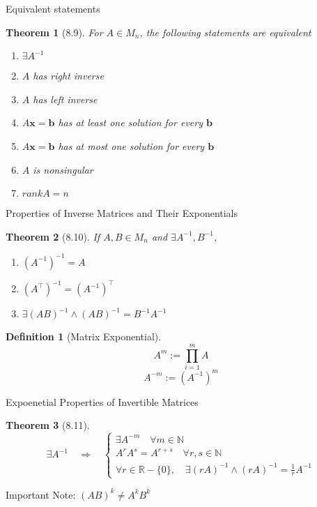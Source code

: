 \documentclass[a4paper,11pt]{article}
\newtheorem{defn}{Definition}
\newtheorem{thm}{Theorem}
\begin{document}
\begin{frame}[t]{Equivalent statements}
	\begin{thm}
		[8.9] For $A\in M_n$, the following statements are equivalent
		\begin{enumerate}
			\item $\exists A^{-1}$
			\item $A$ has right inverse
			\item $A$ has left inverse
			\item $A\mathbf{x}=\mathbf{b}$ has at least one solution for every $\mathbf{b}$
			\item $A\mathbf{x}=\mathbf{b}$ has at most one solution for every $\mathbf{b}$
			\item $A$ is nonsingular
			\item $rank A = n$
		\end{enumerate}
	\end{thm}
\end{frame}

\begin{frame}[t]{Properties of Inverse Matrices and Their Exponentials}
	\begin{thm}
		[8.10] If $A,B\in M_n$ and $\exists A^{-1}, B^{-1}$,
		\begin{enumerate}
			\item $(A^{-1})^{-1}=A$
			\item $(A^\intercal)^{-1}=(A^{-1})^\intercal$
			\item $\exists(AB)^{-1} \land (AB)^{-1}=B^{-1}A^{-1}$
		\end{enumerate}
	\end{thm}
	\begin{defn}
		[Matrix Exponential]
		\[
			A^m := \prod_{i=1}^m A
		\]\[
			A^{-m} := (A^{-1})^m
		\]
	\end{defn}
\end{frame}

\begin{frame}[t]{Expoenetial Properties of Invertible Matrices}
	\begin{thm}
		[8.11] \[
			\exists A^{-1} \quad\Rightarrow\quad \begin{cases}
				\exists A^{-m} \quad\forall m\in\mathbb{N}\\
				A^rA^s = A^{r+s}\quad\forall r,s\in\mathbb{N}\\
				\forall r\in\mathbb{R}-\{0\}, \quad \exists(rA)^{-1}\land (rA)^{-1}=\frac{1}{r}A^{-1}
			\end{cases}
		\]
	\end{thm}
	Important Note: $(AB)^k\neq A^k B^k$
\end{frame}
\end{document}
